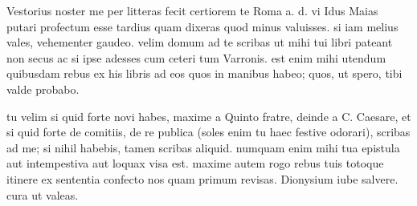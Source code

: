 


 Vestorius noster me per litteras fecit certiorem te Roma a. d. vi Idus Maias putari profectum esse tardius quam dixeras quod minus valuisses. si iam melius vales, vehementer gaudeo. velim domum ad te scribas ut mihi tui libri pateant non secus ac si ipse adesses cum ceteri tum Varronis. est enim mihi utendum quibusdam rebus ex his libris ad eos quos in manibus habeo; quos, ut spero, tibi valde probabo.

 tu velim si quid forte novi habes, maxime a Quinto fratre, deinde a C. Caesare, et si quid forte de comitiis, de re publica (soles enim tu haec festive odorari), scribas ad me; si nihil habebis, tamen scribas aliquid. numquam enim mihi tua epistula aut intempestiva aut loquax visa est. maxime autem rogo rebus tuis totoque itinere ex sententia confecto nos quam primum revisas. Dionysium iube salvere. cura ut valeas.

